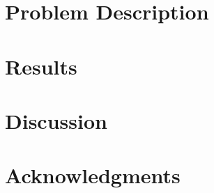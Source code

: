\documentclass[a4paper, twocolumn, oneside]{article}
\begin{document}
    \vspace{-.4cm}

    \newpage

    \setcounter{secnumdepth}{2}
    \setcounter{tocdepth}{2}
    \tableofcontents
    \thispagestyle{empty}
    \newpage
    \setcounter{page}{1}
    \setcounter{section}{0}

    \twocolumn
	\section{Problem Description}
	\label{sec:problem}
	
	
	\clearpage
	
	
	
	\clearpage
	
	\clearpage
	\label{sec:scaling}
	
	\clearpage
	
	\clearpage
	\label{sec:evaluation}
	
	\clearpage
	\section{Results}
	\clearpage
	\section{Discussion}
	\label{sec:discussion}
	\clearpage
	\section{Acknowledgments}
	\label{sec:acknowledgments}


    \onecolumn
    \newpage
    
    
\end{document}
